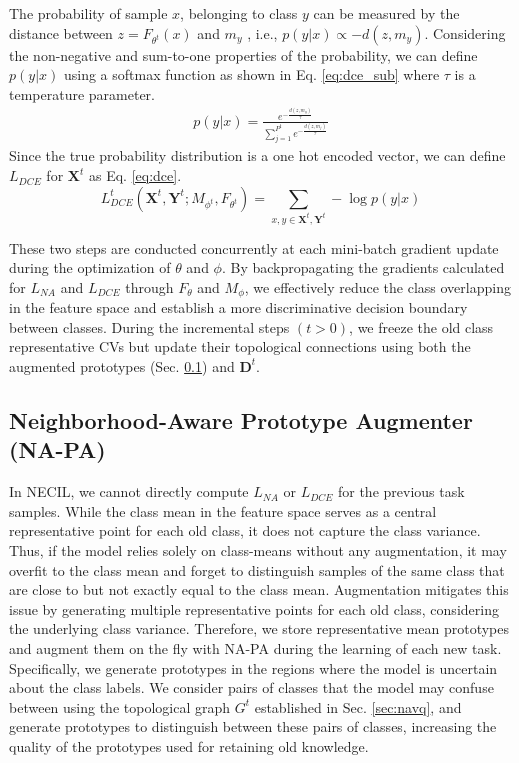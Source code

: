 \documentclass[10pt,twocolumn,letterpaper]{article}
\begin{document}
The probability of sample $x$, belonging to class $y$ can be measured by the distance between $z = F_{\theta^t}(x)$ and $m_y$ \cite{Yang2018RobustLearning}, i.e., $p(y|x) \propto -d(z,m_y)$. 
Considering the non-negative and sum-to-one properties of the probability, we can define $p(y|x)$ using a softmax function as shown in Eq. \ref{eq:dce_sub} where $\tau$ is a temperature parameter.
\begin{align}
p(y|x)=\frac{e^{-\frac{d(z,m_y)}{\tau} }}{\sum_{j=1}^{P^t}e^{-\frac{d(z,m_j)}{\tau}}}
\label{eq:dce_sub}
\end{align}
Since the true probability distribution is a one hot encoded vector,  we can define $L_{DCE}$ for $\mathbf{X}^t$ as Eq. \ref{eq:dce}.
\begin{equation}
L_{DCE}^t(\mathbf{X}^t,\mathbf{Y}^t; M_{\phi^t}, F_{\theta^t}) = \sum_{x,y \in \mathbf{X}^t,\mathbf{Y}^t}-\log p(y|x) 
\label{eq:dce}
\end{equation}

These two steps are conducted concurrently at each mini-batch gradient update during the optimization of $\theta$ and $\phi$. By backpropagating the gradients calculated for $L_{NA}$ and $L_{DCE}$ through $F_\theta$ and $M_\phi$, we effectively reduce the class overlapping in the feature space and establish a more discriminative decision boundary between classes. During the incremental steps $(t>0)$, we freeze the old class representative CVs but update their topological connections using both the augmented prototypes (Sec. \ref{sec:pa}) and $\mathbf{D}^t$.

\subsection{Neighborhood-Aware Prototype Augmenter (NA-PA)}\label{sec:pa}

In NECIL, we cannot directly 
compute $L_{NA}$ or $L_{DCE}$ for the previous task samples. 
While the class mean in the feature space serves as a central representative point for each old class, it does not capture the class variance. Thus, if the model relies solely on class-means without any augmentation, it may overfit to the class mean and forget to distinguish samples of the same class that are close to but not exactly equal to the class mean. Augmentation mitigates this issue by generating multiple representative points for each old class, considering the underlying class variance. Therefore, we store representative mean prototypes
and augment them on the fly with NA-PA during the learning of each new task. Specifically, we generate prototypes in the regions where the model is uncertain about the class labels. We consider pairs of classes that the model may confuse between using the topological graph $G^t$ established in Sec. \ref{sec:navq}, and generate prototypes to distinguish between these pairs of classes, increasing the quality of the prototypes used for retaining old knowledge.
\end{document}
